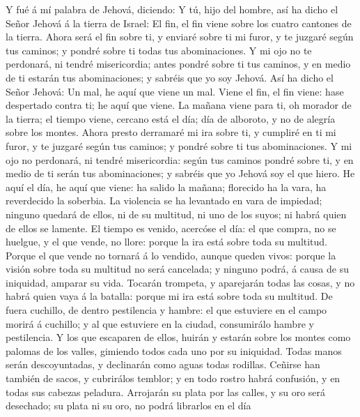  Y fué á mí palabra de Jehová, diciendo:  Y
tú, hijo del hombre, así ha dicho el Señor Jehová á la tierra de Israel:
El fin, el fin viene sobre los cuatro cantones de la tierra.
 Ahora será el fin sobre ti, y enviaré sobre ti mi furor,
y te juzgaré según tus caminos; y pondré sobre ti todas tus
abominaciones.  Y mi ojo no te perdonará, ni tendré
misericordia; antes pondré sobre ti tus caminos, y en medio de ti
estarán tus abominaciones; y sabréis que yo soy Jehová. 
Así ha dicho el Señor Jehová: Un mal, he aquí que viene un mal.
 Viene el fin, el fin viene: hase despertado contra ti; he
aquí que viene.  La mañana viene para ti, oh morador de la
tierra; el tiempo viene, cercano está el día; día de alboroto, y no de
alegría sobre los montes.  Ahora presto derramaré mi ira
sobre ti, y cumpliré en ti mi furor, y te juzgaré según tus caminos; y
pondré sobre ti tus abominaciones.  Y mi ojo no perdonará,
ni tendré misericordia: según tus caminos pondré sobre ti, y en medio de
ti serán tus abominaciones; y sabréis que yo Jehová soy el que hiero.
 He aquí el día, he aquí que viene: ha salido la mañana;
florecido ha la vara, ha reverdecido la soberbia.  La
violencia se ha levantado en vara de impiedad; ninguno quedará de ellos,
ni de su multitud, ni uno de los suyos; ni habrá quien de ellos se
lamente.  El tiempo es venido, acercóse el día: el que
compra, no se huelgue, y el que vende, no llore: porque la ira está
sobre toda su multitud.  Porque el que vende no tornará á
lo vendido, aunque queden vivos: porque la visión sobre toda su multitud
no será cancelada; y ninguno podrá, á causa de su iniquidad, amparar su
vida.  Tocarán trompeta, y aparejarán todas las cosas, y
no habrá quien vaya á la batalla: porque mi ira está sobre toda su
multitud.  De fuera cuchillo, de dentro pestilencia y
hambre: el que estuviere en el campo morirá á cuchillo; y al que
estuviere en la ciudad, consumirálo hambre y pestilencia.
 Y los que escaparen de ellos, huirán y estarán sobre los
montes como palomas de los valles, gimiendo todos cada uno por su
iniquidad.  Todas manos serán descoyuntadas, y declinarán
como aguas todas rodillas.  Ceñirse han también de sacos,
y cubrirálos temblor; y en todo rostro habrá confusión, y en todas sus
cabezas peladura.  Arrojarán su plata por las calles, y
su oro será desechado; su plata ni su oro, no podrá librarlos en el día
